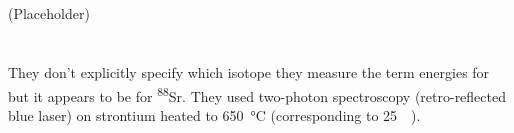 \documentclass{article}
\newcommand{\tsup}{\textsuperscript}													%
\newcommand{\Sr}[1]{\tsup{#1}\textnormal{Sr}}											%
\begin{document}
\section{}

(Placeholder)

\section*{}

They don't explicitly specify which isotope they measure the term energies for but it appears to be for \Sr{88}. They used two-photon spectroscopy (retro-reflected blue laser) on strontium heated to \SI{650}{\celsius} (corresponding to \SI{25}{\milli\Torr}). 

\section*{}
 
\printbibliography
\end{document}
